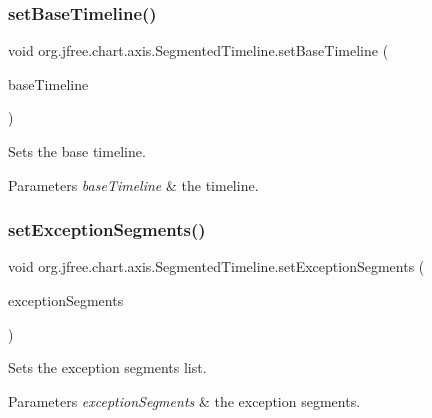 \subsubsection{\texorpdfstring{set\+Base\+Timeline()}{setBaseTimeline()}}
{\footnotesize\ttfamily void org.\+jfree.\+chart.\+axis.\+Segmented\+Timeline.\+set\+Base\+Timeline (\begin{DoxyParamCaption}\item[{\mbox{\hyperlink{classorg_1_1jfree_1_1chart_1_1axis_1_1_segmented_timeline}{Segmented\+Timeline}}}]{base\+Timeline }\end{DoxyParamCaption})}

Sets the base timeline.


\begin{DoxyParams}{Parameters}
{\em base\+Timeline} & the timeline. \\
\hline
\end{DoxyParams}
\mbox{\label{classorg_1_1jfree_1_1chart_1_1axis_1_1_segmented_timeline_aae8d86befd680b576e5c4376193c06d3}} 
\subsubsection{\texorpdfstring{set\+Exception\+Segments()}{setExceptionSegments()}}
{\footnotesize\ttfamily void org.\+jfree.\+chart.\+axis.\+Segmented\+Timeline.\+set\+Exception\+Segments (\begin{DoxyParamCaption}\item[{List}]{exception\+Segments }\end{DoxyParamCaption})}

Sets the exception segments list.


\begin{DoxyParams}{Parameters}
{\em exception\+Segments} & the exception segments. \\
\hline
\end{DoxyParams}
\mbox{\label{classorg_1_1jfree_1_1chart_1_1axis_1_1_segmented_timeline_a24a2da5458afc053a5aa0fad092c1d0f}} 
